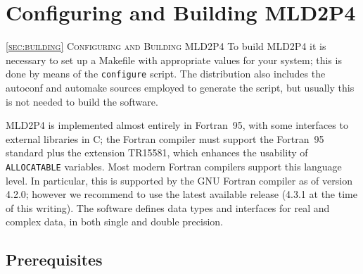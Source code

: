\section{Configuring and Building MLD2P4\label{sec:building}}
         {\textsc{\ref{sec:building} Configuring and Building MLD2P4}}
To build MLD2P4 it is necessary to set up a Makefile with appropriate
values for your system; this is done by means of the \verb|configure|
script. The distribution also includes the autoconf and automake
sources employed to generate the script, but usually this is not needed
to build the software. 

MLD2P4 is implemented almost entirely in Fortran~95, with some
interfaces to external libraries in C; the Fortran compiler
must support the Fortran~95 standard plus the extension TR15581, which
enhances the usability of \verb|ALLOCATABLE| variables. Most modern
Fortran compilers support this language level. In particular, this is
supported by the GNU Fortran compiler as of version 4.2.0; however we
recommend to use the latest available release (4.3.1 at the time of
this writing).
The software defines data types and interfaces for
real and complex data, in both single and double precision. 

\subsection{Prerequisites}

